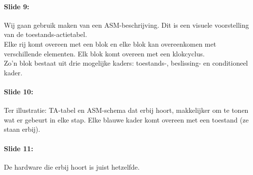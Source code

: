 \documentclass[10pt,a4paper]{book}
\begin{document}
\paragraph{Slide 9:} Wij gaan gebruik maken van een ASM-beschrijving. Dit is een visuele voorstelling van de toestands-actietabel.\\
Elke rij komt overeen met een blok en elke blok kan overeenkomen met verschillende elementen. Elk blok komt overeen met een klokcyclus.\\
Zo'n blok bestaat uit drie mogelijke kaders: toestands-, beslissing- en conditioneel kader.

\paragraph{Slide 10:} Ter illustratie: TA-tabel en ASM-schema dat erbij hoort, makkelijker om te tonen wat er gebeurt in elke stap. Elke blauwe kader komt overeen met een toestand (ze staan erbij). 

\paragraph{Slide 11:} De hardware die erbij hoort is juist hetzelfde.
\end{document}
